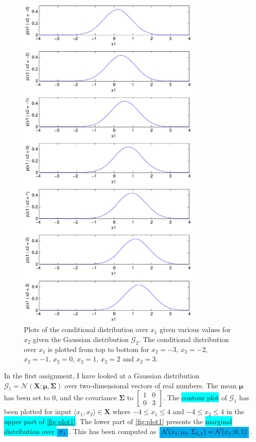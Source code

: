 \documentclass[a4paper,11pt]{article}
\newcommand{\V}[1]{\ensuremath{\mathbf{#1}}}
\newcommand{\mean}{\ensuremath{\boldsymbol{\mu}}}
\newcommand{\cov}{\ensuremath{\boldsymbol{\Sigma}}}
\newcommand{\npdf}{\ensuremath{\mathcal{N}}}
\newcommand{\hl}[1]{\colorbox{cyan}{#1}}
\newcommand{\mhl}[1]{\mathchoice%
  {\colorbox{cyan}{$\displaystyle#1$}}%
  {\colorbox{cyan}{$\textstyle#1$}}%
  {\colorbox{cyan}{$\scriptstyle#1$}}%
  {\colorbox{cyan}{$\scriptscriptstyle#1$}}}
\begin{document}
\begin{figure}
  \begin{center}
    \caption{Plots of the conditional distribution over $x_1$ given various values for $x_2$ given the Gaussian distribution $\mathcal G_2$.  The conditional distribution over $x_1$ is plotted from top to bottom for $x_2 = -3$, $x_2 = -2$, $x_2 = -1$, $x_2 = 0$, $x_2 = 1$, $x_2 = 2$ and $x_2 = 3$.}
    \label{fig:plot4}
    \includegraphics[width=0.8\textwidth]{ex1plot4}
  \end{center}
\end{figure}


In the first assignment, I have looked at a Gaussian distribution $\mathcal G_1 = \npdf(\V{X}; \mean, \cov)$ over two-dimensional vectors of real numbers.  The mean $\mean$ has been set to $0$, and the covariance $\cov$ to $\begin{bmatrix}1&0\\0&3\end{bmatrix}$.  The \hl{contour plot} of $\mathcal G_1$ has been plotted for input $\langle x_1, x_2 \rangle \in \V{X}$ where $-4 \leq x_1 \leq 4$ and $-4 \leq x_2 \leq 4$ in the \hl{upper part of \autoref{fig:plot1}}.  The lower part of \autoref{fig:plot1} presents the \hl{marginal distribution over }$\mhl{x_1}$.  This has been computed as $\mhl{\npdf(x_1; \mu_1, \Sigma_{1,1}) = \npdf(x_1; 0, 1)}$. 
\end{document}
